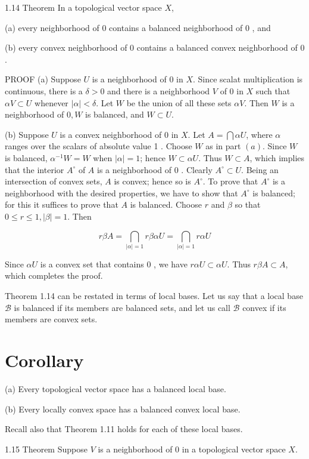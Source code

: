 \documentclass[10pt]{article}
\begin{document}
1.14 Theorem In a topological vector space $X$,

(a) every neighborhood of 0 contains a balanced neighborhood of 0 , and

(b) every convex neighborhood of 0 contains a balanced convex neighborhood of 0 .

PROOF (a) Suppose $U$ is a neighborhood of 0 in $X$. Since scalat multiplication is continuous, there is a $\delta>0$ and there is a neighborhood $V$ of 0 in $X$ such that $\alpha V \subset U$ whenever $|\alpha|<\delta$. Let $W$ be the union of all these sets $\alpha V$. Then $W$ is a neighborhood of $0, W$ is balanced, and $W \subset U$.

(b) Suppose $U$ is a convex neighborhood of 0 in $X$. Let $A=\bigcap \alpha U$, where $\alpha$ ranges over the scalars of absolute value 1 . Choose $W$ as in part $(a)$. Since $W$ is balanced, $\alpha^{-1} W=W$ when $|\alpha|=1$; hence $W \subset \alpha U$. Thus $W \subset A$, which implies that the interior $A^{\circ}$ of $A$ is a neighborhood of 0 . Clearly $A^{\circ} \subset U$. Being an intersection of convex sets, $A$ is convex; hence so is $A^{\circ}$. To prove that $A^{\circ}$ is a neighborhood with the desired properties, we have to show that $A^{\circ}$ is balanced; for this it suffices to prove that $A$ is balanced. Choose $r$ and $\beta$ so that $0 \leq r \leq 1,|\beta|=1$. Then

$$
r \beta A=\bigcap_{|\alpha|=1} r \beta \alpha U=\bigcap_{|\alpha|=1} r \alpha U
$$

Since $\alpha U$ is a convex set that contains 0 , we have $r \alpha U \subset \alpha U$. Thus $r \beta A \subset A$, which completes the proof.

Theorem 1.14 can be restated in terms of local bases. Let us say that a local base $\mathscr{B}$ is balanced if its members are balanced sets, and let us call $\mathscr{B}$ convex if its members are convex sets.

\section{Corollary}
(a) Every topological vector space has a balanced local base.

(b) Every locally convex space has a balanced convex local base.

Recall also that Theorem 1.11 holds for each of these local bases.

1.15 Theorem Suppose $V$ is a neighborhood of 0 in a topological vector space $X$.
\end{document}
